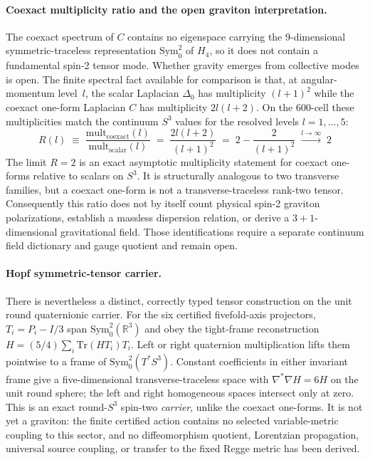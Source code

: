 \documentclass[12pt,a4paper]{article}
\theoremstyle{definition}
\begin{document}
\paragraph{Coexact multiplicity ratio and the open graviton interpretation.}
The coexact spectrum of $C$ contains no eigenspace carrying the 9-dimensional symmetric-traceless representation $\mathrm{Sym}^2_0$ of $H_4$, so it does not contain a fundamental spin-2 tensor mode.  Whether gravity emerges from collective modes is open.  The finite spectral fact available for comparison is that, at angular-momentum level~$l$, the scalar Laplacian $\Delta_0$ has multiplicity $(l+1)^2$ while the coexact one-form Laplacian $C$ has multiplicity $2l(l+2)$.  On the 600-cell these multiplicities match the continuum $S^3$ values for the resolved levels $l=1,\ldots,5$:
\begin{equation}
R(l) \;\equiv\; \frac{\mathrm{mult}_{\mathrm{coexact}}(l)}{\mathrm{mult}_{\mathrm{scalar}}(l)} \;=\; \frac{2l(l+2)}{(l+1)^2} \;=\; 2 - \frac{2}{(l+1)^2} \;\xrightarrow{l\to\infty}\; 2
\label{eq:polarization_ratio}
\end{equation}
The limit $R=2$ is an exact asymptotic multiplicity statement for coexact one-forms relative to scalars on $S^3$.  It is structurally analogous to two transverse families, but a coexact one-form is not a transverse-traceless rank-two tensor.  Consequently this ratio does not by itself count physical spin-2 graviton polarizations, establish a massless dispersion relation, or derive a $3+1$-dimensional gravitational field.  Those identifications require a separate continuum field dictionary and gauge quotient and remain open.

\paragraph{Hopf symmetric-tensor carrier.}
There is nevertheless a distinct, correctly typed tensor construction on the unit round quaternionic carrier.  For the six certified fivefold-axis projectors, $T_i=P_i-I/3$ span $\mathrm{Sym}^2_0(\mathbb{R}^3)$ and obey the tight-frame reconstruction $H=(5/4)\sum_i\mathrm{Tr}(HT_i)T_i$.  Left or right quaternion multiplication lifts them pointwise to a frame of $\mathrm{Sym}^2_0(T^*S^3)$.  Constant coefficients in either invariant frame give a five-dimensional transverse-traceless space with $\nabla^*\nabla H=6H$ on the unit round sphere; the left and right homogeneous spaces intersect only at zero.  This is an exact round-$S^3$ spin-two \emph{carrier}, unlike the coexact one-forms.  It is not yet a graviton: the finite certified action contains no selected variable-metric coupling to this sector, and no diffeomorphism quotient, Lorentzian propagation, universal source coupling, or transfer to the fixed Regge metric has been derived.
\end{document}
